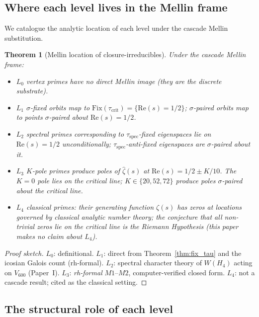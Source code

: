 \documentclass[11pt,a4paper]{article}
\newtheorem{theorem}{Theorem}
\theoremstyle{definition}
\theoremstyle{remark}
\begin{document}
\subsection{Where each level lives in the Mellin frame}\label{ssec:where}

We catalogue the analytic location of each level under the cascade Mellin
substitution.

\begin{theorem}[Mellin location of closure-irreducibles]\label{thm:mellin_location}
Under the cascade Mellin frame:
\begin{itemize}\itemsep0pt
  \item $L_0$ vertex primes have no direct Mellin image (they are the discrete substrate).
  \item $L_1$ $\sigma$-fixed orbits map to $\mathrm{Fix}(\tau_{\mathrm{crit}}) = \{\mathrm{Re}(s) = 1/2\}$; $\sigma$-paired orbits map to points $\sigma$-paired about $\mathrm{Re}(s) = 1/2$.
  \item $L_2$ spectral primes corresponding to $\tau_{\mathrm{spec}}$-fixed eigenspaces lie on $\mathrm{Re}(s) = 1/2$ unconditionally; $\tau_{\mathrm{spec}}$-anti-fixed eigenspaces are $\sigma$-paired about it.
  \item $L_3$ $K$-pole primes produce poles of $\hat{\zeta}(s)$ at $\mathrm{Re}(s) = 1/2 \pm K/10$. The $K=0$ pole lies \emph{on} the critical line; $K \in \{20, 52, 72\}$ produce poles \emph{$\sigma$-paired about} the critical line.
  \item $L_4$ classical primes: their generating function $\zeta(s)$ has zeros at locations governed by classical analytic number theory; the conjecture that all non-trivial zeros lie on the critical line is the Riemann Hypothesis (this paper makes no claim about $L_4$).
\end{itemize}
\end{theorem}

\begin{proof}[Proof sketch]
$L_0$: definitional. $L_1$: direct from Theorem~\ref{thm:fix_tau} and the
icosian Galois count (rh-formal). $L_2$: spectral character theory of
$W(H_4)$ acting on $V_{600}$ (Paper~I). $L_3$: \emph{rh-formal} $M1$--$M2$,
computer-verified closed form. $L_4$: not a cascade result; cited as the
classical setting.
\end{proof}

\subsection{The structural role of each level}\label{ssec:roles}
\end{document}
